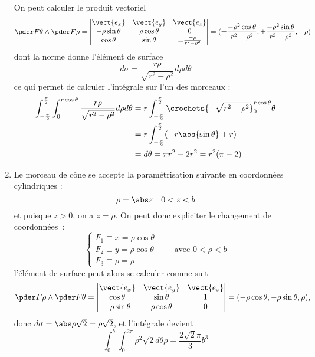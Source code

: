 \begin{enumerate}
On peut calculer le produit vectoriel
\begin{equation*}
\pder F \theta \wedge \pder F \rho =
\begin{vmatrix}
\vect{e_x} & \vect{e_y} & \vect{e_z}\\
-\rho\sin\theta & \rho\cos\theta & 0\\
\cos\theta & \sin\theta & \pm \frac{-\rho}{r^2-\rho^2}
\end{vmatrix} = (\pm\frac{-\rho^2 \cos\theta}{r^2-\rho^2}, \pm
\frac{- \rho^2 \sin\theta}{r^2-\rho^2}, -\rho)
\end{equation*}
dont la norme donne l'élément de surface
\begin{equation*}
d \sigma = \frac{r \rho}{\sqrt{r^2-\rho^2}} d \rho d \theta
\end{equation*}
ce qui permet de calculer l'intégrale sur l'un des morceaux :
\begin{equation*}
\begin{split}
\int_{-\frac\pi2}^{\frac\pi2} \int_0^{r\cos\theta}\frac{r
\rho}{\sqrt{r^2-\rho^2}} d \rho d \theta %
&= r \int_{-\frac\pi2}^{\frac\pi2} \crochets{- \sqrt{r^2-\rho^2}}_0^{r\cos\theta} \theta\\
&= r \int_{-\frac\pi2}^{\frac\pi2} (- r \abs{\sin\theta} + r)\\
	&=d\theta = \pi r^2 - 2 r^2 = r^2 (\pi - 2)
\end{split}
\end{equation*}

\item Le morceau de cône se accepte la paramétrisation suivante en coordonnées cylindriques :
\begin{equation*}
\rho = \abs z \quad 0 < z < b
\end{equation*}
et puisque $z > 0$, on a $z = \rho$. On peut donc expliciter le
changement de coordonnées~:
\begin{equation*}
\begin{cases}
F_1 \equiv x = \rho \cos \theta\\
F_2 \equiv y = \rho \cos \theta\\
F_3 \equiv \rho = \rho
\end{cases} \qquad \text{avec $0 < \rho < b$}
\end{equation*}
l'élément de surface peut alors se calculer comme suit
\begin{equation*}
\pder F \rho \wedge \pder F \theta = %
\begin{vmatrix}
\vect{e_x} & \vect{e_y} & \vect{e_z}\\
\cos\theta & \sin\theta & 1\\
-\rho \sin\theta & \rho \cos \theta & 0
\end{vmatrix} = (- \rho \cos\theta, - \rho \sin\theta, \rho),
\end{equation*}
donc $d\sigma = \abs \rho \sqrt2 = \rho \sqrt 2$, et l'intégrale devient
\begin{equation*}
\int_0^b \int_0^{2\pi} \rho^2 \sqrt 2 d \theta \rho = \frac {2\sqrt2
\pi}3 b^3
\end{equation*}


\end{enumerate}
